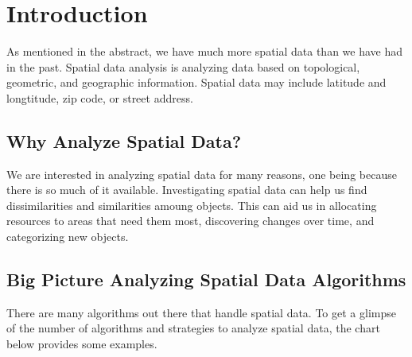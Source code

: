 \documentclass[12pt,twoside]{amherstthesis}
\begin{document}
  \onehalfspacing
  
  \chapter*{Introduction}\label{introduction}
  
  As mentioned in the abstract, we have much more spatial data than we
  have had in the past. Spatial data analysis is analyzing data based on
  topological, geometric, and geographic information. Spatial data may
  include latitude and longtitude, zip code, or street address.
  
  \section{Why Analyze Spatial Data?}\label{why-analyze-spatial-data}
  
  We are interested in analyzing spatial data for many reasons, one being
  because there is so much of it available. Investigating spatial data can
  help us find dissimilarities and similarities amoung objects. This can
  aid us in allocating resources to areas that need them most, discovering
  changes over time, and categorizing new objects.
  
  \section{Big Picture Analyzing Spatial Data
  Algorithms}\label{big-picture-analyzing-spatial-data-algorithms}
  
  There are many algorithms out there that handle spatial data. To get a
  glimpse of the number of algorithms and strategies to analyze spatial
  data, the chart below provides some examples.
  
  \begin{Shaded}
  \begin{Highlighting}[]
  
  \NormalTok{(} \NormalTok{, }
         \NormalTok{, }
         \NormalTok{, } \NormalTok{, } \NormalTok{)}
  \end{Highlighting}
  \end{Shaded}
  
\end{document}
